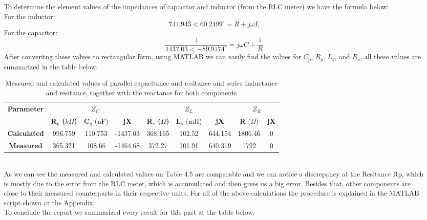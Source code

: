\documentclass[12pt]{report}
\begin{document}
\newpage To determine the element values of the impedances of capacitor and inductor (from the RLC meter) we have the formula below:\\
For the inductor:
$$ 741.943<60.2499^\circ = R+j\omega L $$
For the capacitor:
$$ \frac{1}{1437.03<-89.9174 ^\circ} = j \omega C + \frac{1}{R} $$
After converitng these values to rectangular form, using MATLAB we can easily find the values for $C_p$, $R_p$, $L_s$, and $R_s$, all these values are summarized in the table below:
\begin{table}[h]
\centering
\begin{tabular}{|c|ccc|ccc|cc|}
\hline
\multirow{2}{*}{\textbf{Parameter}} & \multicolumn{3}{c|}{\textbf{$Z_C$}} & \multicolumn{3}{c|}{\textbf{$Z_L$}} & \multicolumn{2}{c|}{\textbf{$Z_R$}} \\
\cline{2-9} 
 & \textbf{R$_p$ ($k\Omega$)} & \textbf{C$_p$} (nF) & \textbf{jX} & \textbf{R$_s$ ($\Omega$)} & \textbf{L$_s$} (mH) & \textbf{jX} & \textbf{R} ($\Omega$) & \textbf{jX} \\
\hline
\textbf{Calculated} & 996.759 & 110.753 & -1437.03 & 368.165 & 102.52 & 644.154 & 1806.46 & 0 \\
\hline
\textbf{Measured} & 365.321 & 108.66  & -1464.68 & 372.27 & 101.91 & 640.319 &  1792 & 0\\
\hline
\end{tabular}
\caption{Measured and calculated values of parallel capacitance and resitance and series Inductance and resitance, together with the reactance for both components}
\label{tab:values}
\end{table}
\\
As we can see the measured and calculated values on Table 4.5 are comparable and we can notice a discrepancy at the Resitance Rp, which is mostly due to the error from the RLC meter, which is accumulated and then gives us a big error. Besides that, other components are close to their measured counterparts in their respective units. For all of the above calculations the procedure is explained in the MATLAB script shown at the Appendix. \\ To conclude the report we summarized every result for this part at the table below:
\newpage
\end{document}
